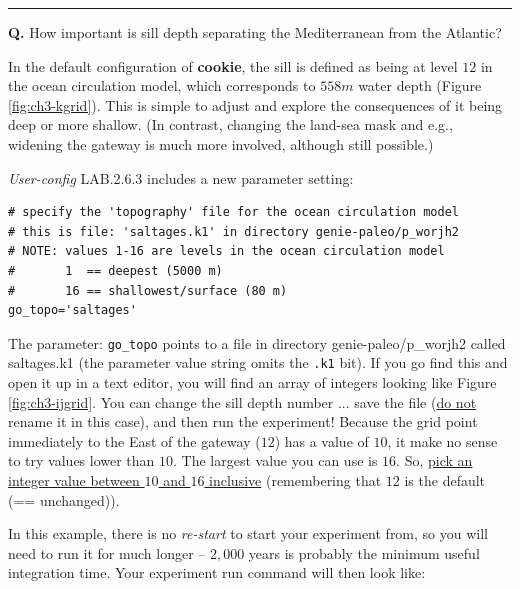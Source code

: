 \vspace{1mm}\noindent\rule{4cm}{0.5pt}\vspace{2mm}

\noindent \textbf{Q.} How important is sill depth separating the Mediterranean from the Atlantic?

\vspace{1mm}
In the default configuration of \textbf{cookie}, the sill is defined as being at level $12$ in the ocean circulation model, which corresponds to $558 m$ water depth (Figure \ref{fig:ch3-kgrid}). This is simple to adjust and explore the consequences of it being deep or more shallow. (In contrast, changing the land-sea mask and e.g., widening the gateway is much more involved, although still possible.)

\vspace{1mm}
\textit{User-config} \textsf{\footnotesize LAB.2.6.3} includes a new parameter setting:
\vspace{-2mm}\small\begin{verbatim}
# specify the 'topography' file for the ocean circulation model
# this is file: 'saltages.k1' in directory genie-paleo/p_worjh2
# NOTE: values 1-16 are levels in the ocean circulation model
#       1  == deepest (5000 m)
#       16 == shallowest/surface (80 m)
go_topo='saltages'
\end{verbatim}\normalsize\vspace{-2mm}

\newpage

The parameter: \texttt{\small go\_topo} points to a file in directory \textsf{\footnotesize genie-paleo/p\_worjh2} called \textsf{\footnotesize saltages.k1} (the parameter value string omits the \texttt{\small .k1} bit). If you go find this and open it up in a text editor, you will find an array of integers looking like Figure \ref{fig:ch3-ijgrid}. You can change the sill depth number ... save the file (\uline{do not} rename it in this case), and then run the experiment! Because the grid point immediately to the East of the gateway ($12$) has a value of $10$, it make no sense to try values lower than $10$. The largest value you can use is $16$. So, \uline{pick an integer value between $10$ and $16$ inclusive} (remembering that $12$ is the default (== unchanged)).

In this example, there is no \textit{re-start} to start your experiment from, so you will need to run it for much longer -- $2,000$ years is probably the minimum useful integration time. Your experiment run command will then look like:

